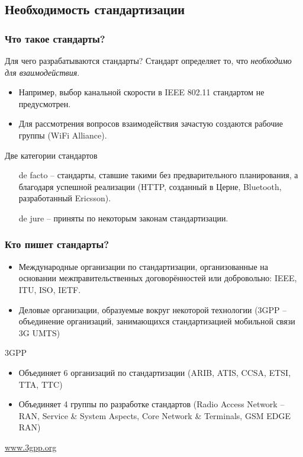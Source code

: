 \documentclass[utf8]{beamer}
\begin{document}
\subsection{Необходимость стандартизации}
\begin{frame}
\frametitle{Что такое стандарты?}
\begin{block}{Для чего разрабатываются стандарты?}
Стандарт определяет то, что \emph{необходимо для взаимодействия}.
\begin{itemize}
 \item Например, выбор канальной скорости в IEEE 802.11 стандартом не предусмотрен.
 \item Для рассмотрения вопросов взаимодействия зачастую создаются рабочие группы (WiFi Alliance).
\end{itemize}
\end{block}
\begin{block}{Две категории стандартов}
\begin{itemize}
 \item[de facto] -- стандарты, ставшие такими без предварительного планирования, а благодаря успешной реализации (HTTP, созданный в Церне, Bluetooth, разработанный Ericsson).
 \item[de jure] -- приняты по некоторым законам стандартизации.
\end{itemize}
\end{block}
\end{frame}
\begin{frame}
\frametitle{Кто пишет стандарты?}
\begin{itemize}
 \item Международные организации по стандартизации, организованные на основании межправительственных договорённостей или добровольно: IEEE, ITU, ISO, IETF.
 \item Деловые организации, образуемые вокруг некоторой технологии (3GPP -- объединение организаций, занимающихся стандартизацией мобильной связи 3G UMTS)
\end{itemize}
\begin{block}{3GPP}
\begin{itemize}
 \item Объединяет 6 организаций по стандартизации (ARIB, ATIS, CCSA, ETSI, TTA, TTC)
 \item Объединяет 4 группы по разработке стандартов (Radio Access Network -- RAN, Service \& System Aspects, Core Network \& Terminals, GSM EDGE RAN)
\end{itemize}
\url{www.3gpp.org}
\end{block}
\end{frame}
\end{document}
